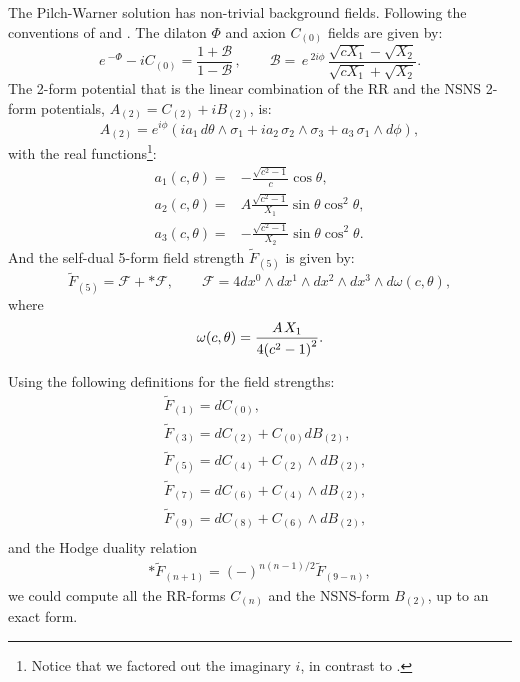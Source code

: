 The Pilch-Warner solution has non-trivial background fields. Following the conventions of \cite{Buchel:2000cn} and \cite{Pilch:2003jg}. The dilaton $\Phi$ and axion $C_{(0)}$ fields are given by:
\begin{equation}
 e\,^{-\Phi }-i C_{(0)} =\frac{1+\mathcal{B}}{1-\mathcal{B}}\,,
 \qquad
 \mathcal{B}=\,e\,^{2i\phi }\,\frac{\sqrt{cX_1}-\sqrt{X_2}}{\sqrt{cX_1}+\sqrt{X_2}}.
\end{equation}
The 2-form potential that is the linear combination of the RR and the NSNS 2-form potentials, $A_{(2)}=C_{(2)}+i B_{(2)}$, is:
\begin{equation}
 A_{(2)} = e^{i \phi}\left(i a_1 \, d\theta \wedge \sigma_1 + i a_2 \, \sigma_2 \wedge \sigma_3 + a_3\, \sigma_1 \wedge d\phi\right),
\end{equation}
with the real functions\footnote{Notice that we factored out the imaginary $i$, in contrast to \cite{Pilch:2003jg}.}:
\begin{align}
a_1(c,\theta) = & - \frac{\sqrt{c^2-1}}{c}\cos\theta,\nonumber\\
a_2(c,\theta) =  & A  \frac{\sqrt{c^2-1}}{X_1}\sin \theta \cos^2 \theta,\nonumber\\
a_3(c,\theta) =  &  -\frac{\sqrt{c^2-1}}{X_2}\sin \theta \cos^2 \theta.
\end{align}
And the self-dual 5-form field strength $\tilde{F}_{(5)}$ is given by:
\begin{equation}
\tilde{F}_{(5)} = \mathcal{F} + *\mathcal{F},
\qquad
\mathcal{F} = 4 d{x^0} \wedge d{x^1} \wedge d{x^2} \wedge d{x^3} \wedge d\omega(c,\theta),
\end{equation}
where 
\begin{equation}
\omega(c,\theta) = \frac{{A{\kern 1pt} {X_1}}}{{4{{\left( {{c^2} - 1} \right)}^2}}}.
\end{equation}

Using the following definitions for the field strengths:
\begin{align}\label{eq:defs2}
&\tilde F_{(1)} = d C_{(0)},\nonumber\\
&\tilde F_{(3)} = d C_{(2)} + C_{(0)} d B_{(2)},\nonumber\\
&\tilde F_{(5)} = d C_{(4)} + C_{(2)} \wedge d B_{(2)},\nonumber\\
&\tilde F_{(7)} = d C_{(6)} + C_{(4)} \wedge d B_{(2)},\nonumber\\
&\tilde F_{(9)} = d C_{(8)} + C_{(6)} \wedge d B_{(2)},\nonumber\\
\end{align}
and the Hodge duality relation 
\begin{align}\label{eq:dualityconstraint}
\ast \tilde F_{(n+1)} =(-)^{n(n-1)/2} \tilde F_{(9-n)},
\end{align}
we could compute all the RR-forms $C_{(n)}$ and the NSNS-form $B_{(2)}$, up to an exact form. 

